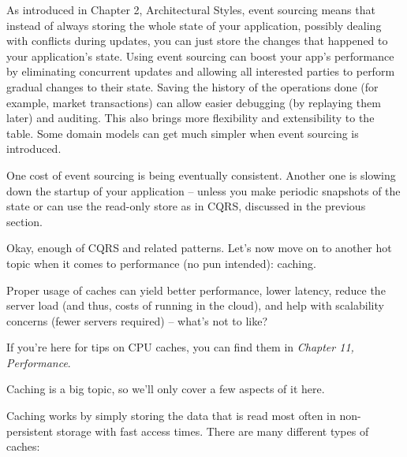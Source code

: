 As introduced in Chapter 2, Architectural Styles, event sourcing means that instead of always storing the whole state of your application, possibly dealing with conflicts during updates, you can just store the changes that happened to your application's state. Using event sourcing can boost your app's performance by eliminating concurrent updates and allowing all interested parties to perform gradual changes to their state. Saving the history of the operations done (for example, market transactions) can allow easier debugging (by replaying them later) and auditing. This also brings more flexibility and extensibility to the table. Some domain models can get much simpler when event sourcing is introduced.

One cost of event sourcing is being eventually consistent. Another one is slowing down the startup of your application – unless you make periodic snapshots of the state or can use the read-only store as in CQRS, discussed in the previous section.

Okay, enough of CQRS and related patterns. Let's now move on to another hot topic when it comes to performance (no pun intended): caching.


Proper usage of caches can yield better performance, lower latency, reduce the server load (and thus, costs of running in the cloud), and help with scalability concerns (fewer servers required) – what's not to like?

\begin{tcolorbox}[colback=blue!5!white,colframe=blue!75!black, title=Note]
\hspace*{0.7cm}If you're here for tips on CPU caches, you can find them in \textit{Chapter 11, Performance}.

\end{tcolorbox}

Caching is a big topic, so we'll only cover a few aspects of it here.

Caching works by simply storing the data that is read most often in non-persistent storage with fast access times. There are many different types of caches: 

